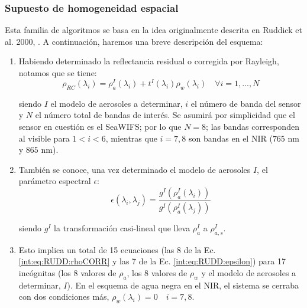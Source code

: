         \subsubsection{Supuesto de homogeneidad espacial}
        \label{int:s:ACmumm}
            Esta familia de algoritmos se basa en la idea originalmente descrita en Ruddick et al. 2000, \cite{ruddick2000}. A continuación, haremos una breve descripción del esquema:
            
            \begin{enumerate}

                \item Habiendo determinado la reflectancia residual o corregida por Rayleigh, notamos que se tiene:
                \begin{equation}
                    \rho_{RC}(\lambda_{i})=\rho_{a}^{I}(\lambda_{i})+t^{I}(\lambda_{i})\rho_{w}(\lambda_{i})\quad \forall i=1,...,N
                    \label{int:eq:RUDD:rhoCORR}
                \end{equation}
                
                \noindent siendo $I$ el modelo de aerosoles a determinar, $i$ el número de banda del sensor y $N$ el número total de bandas de interés. Se asumirá por simplicidad que el sensor en cuestión es el SeaWIFS; por lo que $N=8$; las bandas corresponden al visible para $1<i<6$, mientras que $i=7,8$ son bandas en el NIR ($765$ nm y $865$ nm).
                
                \item También se conoce, una vez determinado el modelo de aerosoles $I$, el parámetro espectral $\epsilon$:
                \begin{equation}
                \epsilon(\lambda_{i},\lambda_{j})=\frac{g^{I}(\rho_{a}^{I}(\lambda_{i}))}{g^{I}(\rho_{a}^{I}(\lambda_{j}))}
                \label{int:eq:RUDD:epsilon}
                \end{equation}
    
                \noindent siendo $g^{I}$ la transformación casi-lineal que lleva $\rho_{a}^{I}$ a $\rho_{a,s}^{I}$.
                
                \item Esto implica un total de 15 ecuaciones (las 8 de la Ec. \ref{int:eq:RUDD:rhoCORR} y las 7 de la Ec. \ref{int:eq:RUDD:epsilon}) para 17 incógnitas (los 8 valores de $\rho_{a}$, los 8 valores de $\rho_{w}$ y el modelo de aerosoles a determinar, $I$). En el esquema de agua negra en el NIR, el sistema se cerraba con dos condiciones más, $\rho_{w}(\lambda_{i})=0\quad i=7,8$.


\end{enumerate}
